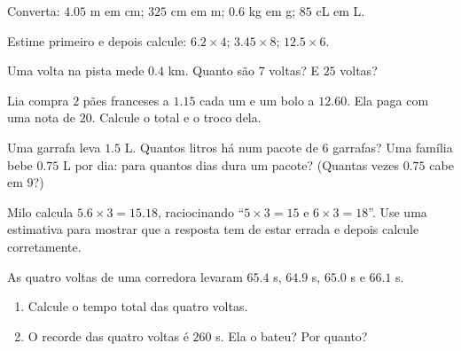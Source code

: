 \begin{exercise}[$\star$]\label{exo:g5:decimalops:5}
Converta: $4.05$ m em cm; \quad $325$ cm em m; \quad $0.6$ kg em g;
\quad $85$ cL em L.
\end{exercise}

\begin{exercise}[$\star$]\label{exo:g5:decimalops:6}
Estime primeiro e depois calcule: $6.2 \times 4$; \quad
$3.45 \times 8$; \quad $12.5 \times 6$.
\end{exercise}

\begin{exercise}[$\star$]\label{exo:g5:decimalops:7}
Uma volta na pista mede $0.4$ km. Quanto são $7$ voltas? E $25$
voltas?
\end{exercise}

\begin{exercise}[$\star$]\label{exo:g5:decimalops:8}
Lia compra $2$ pães franceses a $1.15$ cada um e um bolo a $12.60$.
Ela paga com uma nota de $20$. Calcule o total e o troco dela.
\end{exercise}

\begin{exercise}[$\star$]\label{exo:g5:decimalops:9}
Uma garrafa leva $1.5$ L. Quantos litros há num pacote de $6$
garrafas? Uma família bebe $0.75$ L por dia: para quantos dias dura
um pacote? (Quantas vezes $0.75$ cabe em $9$?)
\end{exercise}

\begin{exercise}[$\star\star$]\label{exo:g5:decimalops:10}
Milo calcula $5.6 \times 3 = 15.18$, raciocinando ``$5 \times 3 = 15$
e $6 \times 3 = 18$''. Use uma estimativa para mostrar que a resposta
tem de estar errada e depois calcule corretamente.
\end{exercise}

\begin{exercise}[$\star\star$]\label{exo:g5:decimalops:11}
As quatro voltas de uma corredora levaram $65.4$ s, $64.9$ s,
$65.0$ s e $66.1$ s.
\begin{enumerate}
  \item Calcule o tempo total das quatro voltas.
  \item O recorde das quatro voltas é $260$ s. Ela o bateu? Por
        quanto?
\end{enumerate}
\end{exercise}
